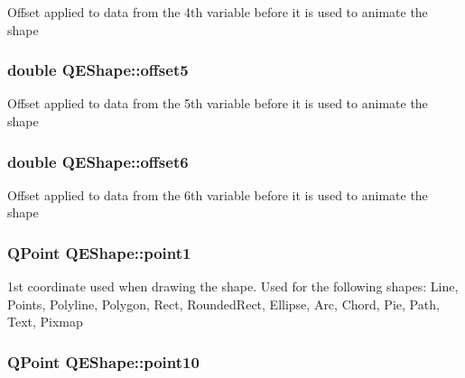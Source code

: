 \label{classQEShape_ae44e71e3555a29795e8ade5997b8b263}
Offset applied to data from the 4th variable before it is used to animate the shape \hypertarget{classQEShape_a11a45d44e7488a4ae9cdd7911ef0c2a8}{
\subsubsection[{offset5}]{\setlength{\rightskip}{0pt plus 5cm}double QEShape::offset5}}
\label{classQEShape_a11a45d44e7488a4ae9cdd7911ef0c2a8}
Offset applied to data from the 5th variable before it is used to animate the shape \hypertarget{classQEShape_ad79ddaf949b7680c4c426a44a94d7768}{
\subsubsection[{offset6}]{\setlength{\rightskip}{0pt plus 5cm}double QEShape::offset6}}
\label{classQEShape_ad79ddaf949b7680c4c426a44a94d7768}
Offset applied to data from the 6th variable before it is used to animate the shape \hypertarget{classQEShape_a23eef41ef82be0c55ee604e0abca991b}{
\subsubsection[{point1}]{\setlength{\rightskip}{0pt plus 5cm}QPoint QEShape::point1}}
\label{classQEShape_a23eef41ef82be0c55ee604e0abca991b}
1st coordinate used when drawing the shape. Used for the following shapes: Line, Points, Polyline, Polygon, Rect, RoundedRect, Ellipse, Arc, Chord, Pie, Path, Text, Pixmap \hypertarget{classQEShape_a3557c0b5e19c30b482b774f1da72313c}{
\subsubsection[{point10}]{\setlength{\rightskip}{0pt plus 5cm}QPoint QEShape::point10}}
